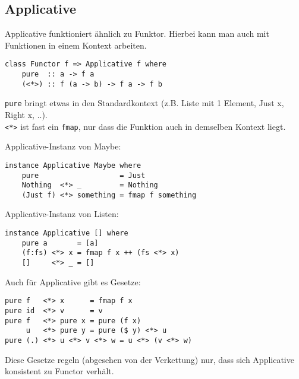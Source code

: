 \documentclass{beamer}
\begin{document}
\subsection{Applicative}
\begin{frame}[fragile]
Applicative funktioniert ähnlich zu Funktor. Hierbei kann man auch mit Funktionen in einem Kontext arbeiten.\\
\pause
\begin{verbatim}
class Functor f => Applicative f where
    pure  :: a -> f a
    (<*>) :: f (a -> b) -> f a -> f b
\end{verbatim}
\pause
\texttt{pure} bringt etwas in den Standardkontext (z.B. Liste mit 1 Element, Just x, Right x, ..).\\
\texttt{<*>} ist fast ein \texttt{fmap}, nur dass die Funktion auch in demselben Kontext liegt.
\end{frame}

\begin{frame}[fragile]
Applicative-Instanz von Maybe:
\begin{verbatim}
instance Applicative Maybe where
    pure                   = Just
    Nothing  <*> _         = Nothing
    (Just f) <*> something = fmap f something
\end{verbatim}
\begin{comment}
\pause
Applicative-Instanz von Either:
\begin{verbatim}
instance Applicative Either where
    pure                    = Right
    (Right f) <*> something = fmap f something
    (Left e)  <*> _         = Left e
\end{verbatim}
\end{comment}
\pause
Applicative-Instanz von Listen:
\begin{verbatim}
instance Applicative [] where
    pure a       = [a]
    (f:fs) <*> x = fmap f x ++ (fs <*> x)
    []     <*> _ = []
\end{verbatim}
\end{frame}

\begin{frame}[fragile]
Auch für Applicative gibt es Gesetze:
\begin{verbatim}
pure f   <*> x      = fmap f x
pure id  <*> v      = v
pure f   <*> pure x = pure (f x)
     u   <*> pure y = pure ($ y) <*> u
pure (.) <*> u <*> v <*> w = u <*> (v <*> w)
\end{verbatim}
Diese Gesetze regeln (abgesehen von der Verkettung) nur, dass sich Applicative konsistent zu Functor verhält.
\end{frame}
\end{document}
